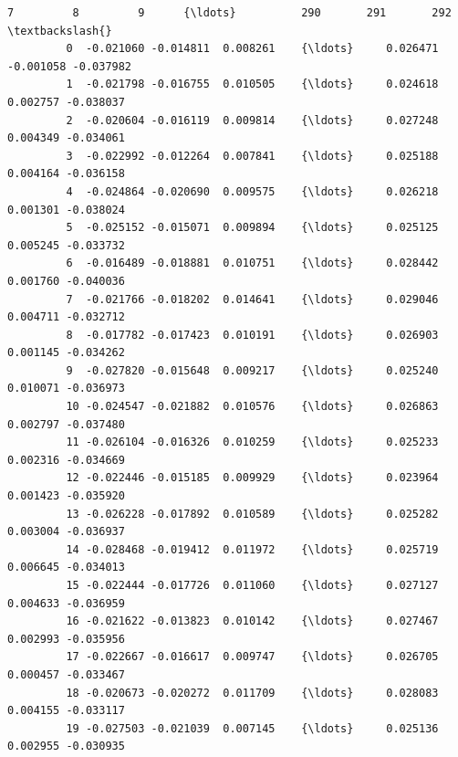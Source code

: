\documentclass[11pt]{article}
\begin{document}
\begin{Verbatim}[commandchars=\\\{\}]
                  7         8         9      {\ldots}          290       291       292  \textbackslash{}
         0  -0.021060 -0.014811  0.008261    {\ldots}     0.026471 -0.001058 -0.037982   
         1  -0.021798 -0.016755  0.010505    {\ldots}     0.024618  0.002757 -0.038037   
         2  -0.020604 -0.016119  0.009814    {\ldots}     0.027248  0.004349 -0.034061   
         3  -0.022992 -0.012264  0.007841    {\ldots}     0.025188  0.004164 -0.036158   
         4  -0.024864 -0.020690  0.009575    {\ldots}     0.026218  0.001301 -0.038024   
         5  -0.025152 -0.015071  0.009894    {\ldots}     0.025125  0.005245 -0.033732   
         6  -0.016489 -0.018881  0.010751    {\ldots}     0.028442  0.001760 -0.040036   
         7  -0.021766 -0.018202  0.014641    {\ldots}     0.029046  0.004711 -0.032712   
         8  -0.017782 -0.017423  0.010191    {\ldots}     0.026903  0.001145 -0.034262   
         9  -0.027820 -0.015648  0.009217    {\ldots}     0.025240  0.010071 -0.036973   
         10 -0.024547 -0.021882  0.010576    {\ldots}     0.026863  0.002797 -0.037480   
         11 -0.026104 -0.016326  0.010259    {\ldots}     0.025233  0.002316 -0.034669   
         12 -0.022446 -0.015185  0.009929    {\ldots}     0.023964  0.001423 -0.035920   
         13 -0.026228 -0.017892  0.010589    {\ldots}     0.025282  0.003004 -0.036937   
         14 -0.028468 -0.019412  0.011972    {\ldots}     0.025719  0.006645 -0.034013   
         15 -0.022444 -0.017726  0.011060    {\ldots}     0.027127  0.004633 -0.036959   
         16 -0.021622 -0.013823  0.010142    {\ldots}     0.027467  0.002993 -0.035956   
         17 -0.022667 -0.016617  0.009747    {\ldots}     0.026705  0.000457 -0.033467   
         18 -0.020673 -0.020272  0.011709    {\ldots}     0.028083  0.004155 -0.033117   
         19 -0.027503 -0.021039  0.007145    {\ldots}     0.025136  0.002955 -0.030935   
         

\end{Verbatim}
\end{document}
